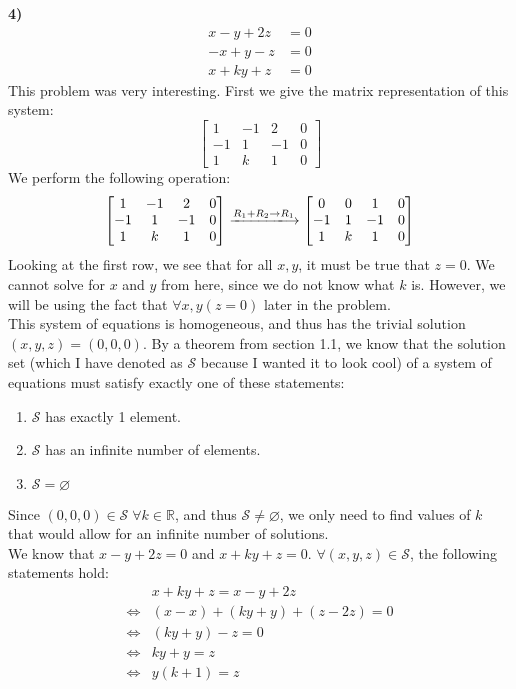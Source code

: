 \documentclass{article}
\newcommand{\R}{\mathbb{R}} %
\begin{document}
\noindent\textbf{4)}
\begin{align*}
x-y+2z&=0\\
-x+y-z&=0\\
x+ky+z&=0
\end{align*}
This problem was very interesting. First we give the matrix representation of this system:
$$\begin{bmatrix}
	1&-1&2&0\\-1&1&-1&0\\1&k&1&0
\end{bmatrix}$$
We perform the following operation:
$$\begin{bmatrix}
	1&-1&2&0\\-1&1&-1&0\\1&k&1&0
\end{bmatrix}\xlongrightarrow{R_1+R_2\rightarrow R_1}\begin{bmatrix}
0&0&1&0\\-1&1&-1&0\\1&k&1&0
\end{bmatrix}$$
Looking at the first row, we see that for all $x,y$, it must be true that $z=0$. We cannot solve for $x$ and $y$ from here, since we do not know what $k$ is. However, we will be using the fact that $\forall x,y(z=0)$ later in the problem.\\
This system of equations is homogeneous, and thus has the trivial solution $(x,y,z)=(0,0,0)$. By a theorem from section 1.1, we know that the solution set (which I have denoted as $\mathcal{S}$ because I wanted it to look cool) of a system of equations must satisfy exactly one of these statements:
\begin{enumerate}
	\item $\mathcal{S}$ has exactly 1 element.
	\item $\mathcal{S}$ has an infinite number of elements.
	\item $\mathcal{S}=\varnothing$
\end{enumerate}
Since $(0,0,0)\in\mathcal{S}\;\forall k\in\R$, and thus $\mathcal{S}\neq\varnothing$, we only need to find values of $k$ that would allow for an infinite number of solutions.\\
We know that $x-y+2z=0$ and $x+ky+z=0$. $\forall(x,y,z)\in\mathcal{S}$, the following statements hold:
\begin{align*}
&x+ky+z=x-y+2z\\
\Longleftrightarrow&(x-x)+(ky+y)+(z-2z)=0\\
\Longleftrightarrow&(ky+y)-z=0\\
\Longleftrightarrow&ky+y=z\\
\Longleftrightarrow&y(k+1)=z
\end{align*}
\end{document}
